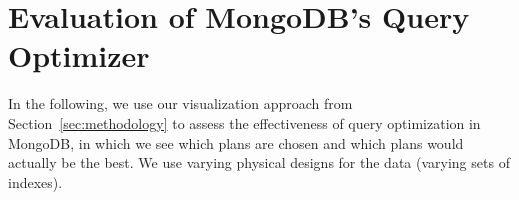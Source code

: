 %

\section{Evaluation of MongoDB's \approachName Query Optimizer}
\label{sec:evaluation}

\begin{comment} Michael: done
\af{The textual values for accuracy, impact, maximum impact etc, seem to be the same as in VLDB 2021 submission! Please get the values from the latest experiments, and put them in.}
\end{comment}

In the following, we use our visualization approach from Section~\ref{sec:methodology} to assess the effectiveness of \approachName query optimization in MongoDB, in which we see which plans are chosen and which plans would actually be the best. We use varying physical designs for the data (varying sets of indexes).




